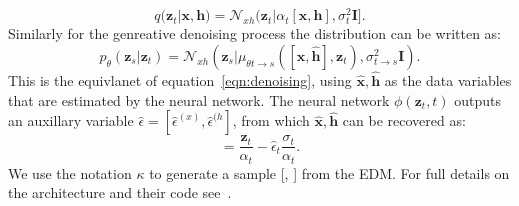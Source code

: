 \documentclass[journal=jacsat,manuscript=article]{achemso}
\begin{document}
\begin{equation}
    q(\mathbf{z}_t| \mathbf{x},\mathbf{h}) = \mathcal{N}_{xh}(\mathbf{z}_t|\alpha_t[\mathbf{x,h}],\sigma^2_t\mathbf{I}].
\end{equation}
Similarly for the genreative denoising process the distribution can be written as:
\begin{equation}
    p_\theta(\mathbf{z}_s| \mathbf{z}_t) = \mathcal{N}_{xh}(\mathbf{z}_s | \mu_{\theta t\rightarrow s}( [ \mathbf{\hat{x},\hat{h}}],\mathbf{z}_t),\sigma_{t\rightarrow s}^2\mathbf{I}).
\end{equation}
This is the equivlanet of equation~\ref{eqn:denoising}, using $\mathbf{\hat{x}}, \mathbf{\hat{h}}$ as the data variables that are estimated by the neural network. The neural network $\phi(\mathbf{z}_t,t)$ outputs an auxillary variable $\hat\epsilon = [\hat{\epsilon}^{(x)},\hat{\epsilon}^{(h}]$, from which $\mathbf{\hat{x}}, \mathbf{\hat{h}}$ can be recovered as:
\begin{equation}
    [\mathbf{\hat{x}}, \mathbf{\hat{h}}] = \frac{\mathbf{z}_t}{\alpha_t}-\hat{\epsilon}_t\frac{\sigma_t}{\alpha_t}.
\end{equation}
We use the notation $\kappa$ to generate a sample [, ] from the EDM. 
For full details on the architecture and their code see~\cite{hoogeboom2022equivariant}. 

\end{document}
